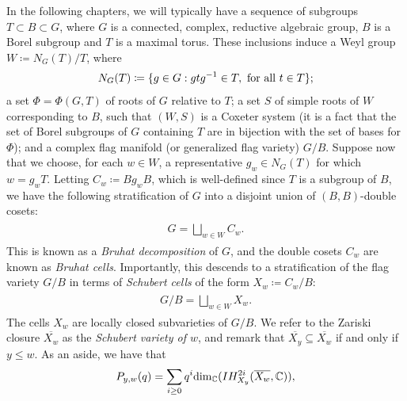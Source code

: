 \noindent\begin{remark}\label{2Grading} In the following chapters, we will typically have a sequence of subgroups $T \subset B \subset G$, where $G$ is a connected, complex, reductive algebraic group, $B$ is a Borel subgroup and $T$ is a maximal torus. These inclusions induce a Weyl group $W \coloneqq N_G(T)/T$, where
\begin{align*}
\begin{split}
N_G(T) \coloneqq \{g \in G : gtg^{-1} \in T,\ \textnormal{for all $t \in T$}\};
\end{split}
\end{align*}
\noindent a set $\Phi = \Phi(G, T)$ of roots of $G$ relative to $T$; a set $S$ of simple roots of $W$ corresponding to $B$, such that $(W, S)$ is a Coxeter system (it is a fact that the set of Borel subgroups of $G$ containing $T$ are in bijection with the set of bases for $\Phi$); %
and a complex flag manifold (or generalized flag variety) $G/B$. Suppose now that we choose, for each $w \in W$, a representative $g_w \in N_G(T)$ for which $w = g_wT$. Letting $C_w \coloneqq Bg_wB$, which is well-defined since $T$ is a subgroup of $B$, we have the following stratification of $G$ into a disjoint union of $(B, B)$-double cosets:
\begin{align*}
\begin{split}
G = \bigsqcup_{w \in W} C_w.
\end{split}
\end{align*}
\noindent This is known as a {\em Bruhat decomposition} of $G$, and the double cosets $C_w$ are known as {\em Bruhat cells}. Importantly, this descends to a stratification of the flag variety $G/B$ in terms of {\em Schubert cells} of the form $X_w \coloneqq C_w/B$:
\begin{align*}
\begin{split}
G/B = \bigsqcup_{w \in W} X_w.
\end{split}
\end{align*}
\noindent The cells $X_w$ are locally closed subvarieties of $G/B$. We refer to the Zariski closure $\overline{X_w}$ as the {\em Schubert variety of $w$}, and remark that $\overline{X_y} \subseteq \overline{X_w}$ if and only if $y \leq w$. As an aside, we have that
\begin{align*}
\begin{split}
P_{y,w}(q) = \sum_{i \geq 0} q^i \textnormal{dim}_\mathbb{C}(IH^{2i}_{X_y}(\overline{X_w}, \mathbb{C})),

\end{split}
\end{align*}
\end{remark}
